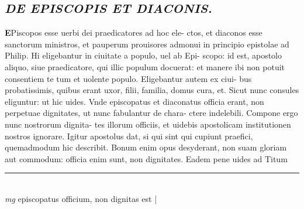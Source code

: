 \documentclass{article}
\begin{document}
\begin{pages}
\subsection*{\textit{DE EPISCOPIS ET DIACONIS. }}\pstart \huge\textbf{E}\normalsize Piscopos esse uerbi dei praedicatores ad hoc ele- ctos, et diaconos esse sanctorum ministros, et pauperum prouisores admonui in principio epistolae ad Philip. Hi eligebantur in ciuitate a populo, uel ab Epi- scopo: id est, apostolo aliquo, siue praedicatore, qui illic populum docuerat: et manere ibi non potuit consentiem te tum et uolente populo. Eligebantur autem ex ciui- bus probatissimis, quibus erant uxor, filii, familia, domus cura, et. Sicut nunc consules eliguntur: ut hic uides. Vnde episcopatus et diaconatus officia erant, non perpetuae dignitates, ut nunc fabulantur de chara- ctere indelebili. Compone ergo nunc nostrorum dignita- tes illorum officiis, et uidebis apostolicam institutionen nostros ignorare. Igitur apostolus dat, si qui sint qui cupiunt praefici, quemadmodum hic describit. Bonum enim opus desyderant, non suam gloriam aut commodum: officia enim sunt, non dignitates. Eadem pene uides ad Titum  \pend
\vspace{0.5cm}\noindent
\vspace{0.2cm}\rule{1cm}{0.2pt}\\ 
\hspace{0.2cm}\textit{mg}
\footnotesize episcopatus officium, non dignitas est 
\normalsize| 
\endnumbering
\end{pages}
\end{document}
